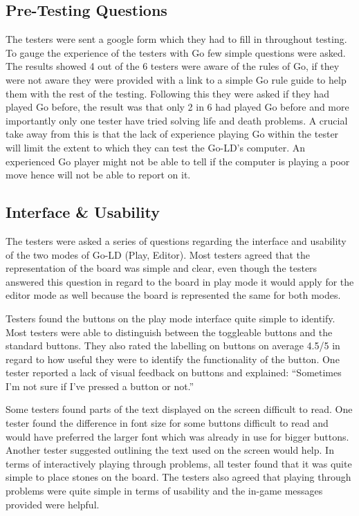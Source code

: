 \documentclass{l4proj}
\begin{document}
\subsection{Pre-Testing Questions}
The testers were sent a google form which they had to fill in throughout testing. To gauge the experience of the testers with Go few simple questions were asked. The results showed 4 out of the 6 testers were aware of the rules of Go, if they were not aware they were provided with a link to a simple Go rule guide to help them with the rest of the testing. Following this they were asked if they had played Go before, the result was that only 2 in 6 had played Go before and more importantly only one tester have tried solving life and death problems. A crucial take away from this is that the lack of experience playing Go within the tester will limit the extent to which they can test the Go-LD’s computer. An experienced Go player might not be able to tell if the computer is playing a poor move hence will not be able to report on it.

\subsection{Interface \& Usability}
The testers were asked a series of questions regarding the interface and usability of the two modes of Go-LD (Play, Editor). Most testers agreed that the representation of the board was simple and clear, even though the testers answered this question in regard to the board in play mode it would apply for the editor mode as well because the board is represented the same for both modes.

Testers found the buttons on the play mode interface quite simple to identify. Most testers were able to distinguish between the toggleable buttons and the standard buttons. They also rated the labelling on buttons on average 4.5/5 in regard to how useful they were to identify the functionality of the button. One tester reported a lack of visual feedback on buttons and explained: “Sometimes I'm not sure if I've pressed a button or not.”

Some testers found parts of the text displayed on the screen difficult to read. One tester found the difference in font size for some buttons difficult to read and would have preferred the larger font which was already in use for bigger buttons. Another tester suggested outlining the text used on the screen would help. In terms of interactively playing through problems, all tester found that it was quite simple to place stones on the board. The testers also agreed that playing through problems were quite simple in terms of usability and the in-game messages provided were helpful.
\end{document}
